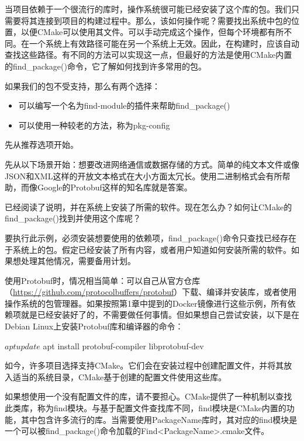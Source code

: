 
当项目依赖于一个很流行的库时，操作系统很可能已经安装了这个库的包。我们只需要将其连接到项目的构建过程中。那么，该如何操作呢？需要找出系统中包的位置，以便CMake可以使用其文件。可以手动完成这个操作，但每个环境都有所不同。在一个系统上有效路径可能在另一个系统上无效。因此，在构建时，应该自动查找这些路径。有不同的方法可以实现这一点，但最好的方法是使用CMake内置的find\_package()命令，它了解如何找到许多常用的包。

如果我们的包不受支持，那么有两个选择：

\begin{itemize}
\item
可以编写一个名为find-module的插件来帮助find\_package()

\item
可以使用一种较老的方法，称为pkg-config
\end{itemize}

先从推荐选项开始。


先从以下场景开始：想要改进网络通信或数据存储的方式。简单的纯文本文件或像JSON和XML这样的开放文本格式在大小方面太冗长。使用二进制格式会有所帮助，而像Google的Protobuf这样的知名库就是答案。

已经阅读了说明，并在系统上安装了所需的软件。现在怎么办？如何让CMake的find\_package()找到并使用这个库呢？

要执行此示例，必须安装想要使用的依赖项，find\_package()命令只查找已经存在于系统上的包。假定已经安装了所有内容，或者用户知道如何安装所需的软件。如果想处理其他情况，需要备用计划。

使用Protobuf时，情况相当简单：可以自己从官方仓库（\url{https://github.com/protocolbuffers/protobuf}）下载、编译并安装库，或者使用操作系统的包管理器。如果按照第1章中提到的Docker镜像进行这些示例，所有依赖项就是已经安装好了的，不需要做任何事情。但如果想自己尝试安装，以下是在Debian Linux上安装Protobuf库和编译器的命令：

\begin{shell}
$ apt update
$ apt install protobuf-compiler libprotobuf-dev
\end{shell}

如今，许多项目选择支持CMake。它们会在安装过程中创建配置文件，并将其放入适当的系统目录，CMake基于创建的配置文件使用这些库。

如果想使用一个没有配置文件的库，请不要担心。CMake提供了一种机制以查找此类库，称为find模块。与基于配置文件查找库不同，find模块是CMake内置的功能，其中包含许多流行的库。当需要使用PackageName库时，其对应的find模块是一个可以被find\_package()命令加载的Find<PackageName>.cmake文件。

